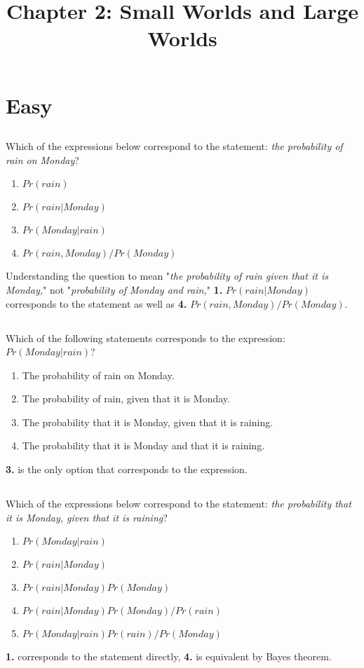 \documentclass{article}
\begin{document}
\title{Chapter 2: Small Worlds and Large Worlds}

\section{Easy}

\subsection{}
Which of the expressions below correspond to the statement: \textit{the probability of rain on Monday}?
\begin{enumerate}
  \item $Pr(rain)$
  \item $Pr(rain | Monday)$
  \item $Pr(Monday | rain)$
  \item $Pr(rain, Monday) / Pr(Monday)$
\end{enumerate}
Understanding the question to mean "\textit{the probability of rain given that it is Monday,}" not "\textit{probability of Monday and rain,}" \textbf{1.} $Pr(rain|Monday)$ corresponds to the statement as well as \textbf{4.} $Pr(rain, Monday) / Pr(Monday)$.

\subsection{}
Which of the following statements corresponds to the expression: $Pr(Monday|rain)$?
\begin{enumerate}
  \item The probability of rain on Monday.
  \item The probability of rain, given that it is Monday.
  \item The probability that it is Monday, given that it is raining.
  \item The probability that it is Monday and that it is raining.
\end{enumerate}
\textbf{3.} is the only option that corresponds to the expression.

\subsection{}
Which of the expressions below correspond to the statement: \textit{the probability that it is Monday,
given that it is raining}?
\begin{enumerate}
  \item $Pr(Monday|rain)$
  \item $Pr(rain|Monday)$
  \item $Pr(rain|Monday) Pr(Monday)$
  \item $Pr(rain|Monday) Pr(Monday)/ Pr(rain)$
  \item $Pr(Monday|rain) Pr(rain)/ Pr(Monday)$
\end{enumerate}
\textbf{1.} corresponds to the statement directly, \textbf{4.} is equivalent by Bayes theorem.
\end{document}
